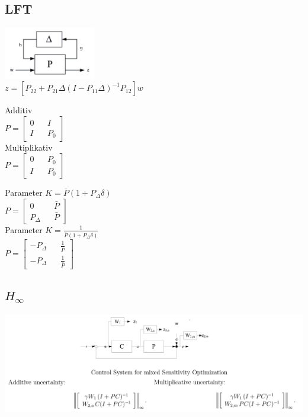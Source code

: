 \subsection{LFT}
	\parbox{6cm}{
	\includegraphics[width=4cm]{./bilder/rob_lft.png}\\
	$z=\left[ P_{22} + P_{21} \Delta(I-P_{11}\Delta)^{-1}P_{12}\right]w$}
	\parbox{4cm}{
		Additiv\\
		$P=\begin{bmatrix}
			0 && I \\
			I && P_0
		\end{bmatrix}$\\
		Multiplikativ\\
		$P=\begin{bmatrix}
			0 && P_0 \\
			I && P_0
		\end{bmatrix}$
		}
	\parbox{5cm}{
		Parameter $K=\bar{P}(1+P_\Delta\delta)$\\
		$P=\begin{bmatrix}
			0 && \bar{P} \\
			P_\Delta && \bar{P}
		\end{bmatrix}$\\
		Parameter $K=\frac{1}{\bar{P}(1+P_\Delta\delta)}$\\
		$P=\begin{bmatrix}
			-P_\Delta && \frac{1}{\bar{P}} \\
			-P_\Delta && \frac{1}{\bar{P}}
		\end{bmatrix}$
		}

\subsection{$H_\infty$}
\includegraphics[width=15cm]{./bilder/rob_hinf.png}\\